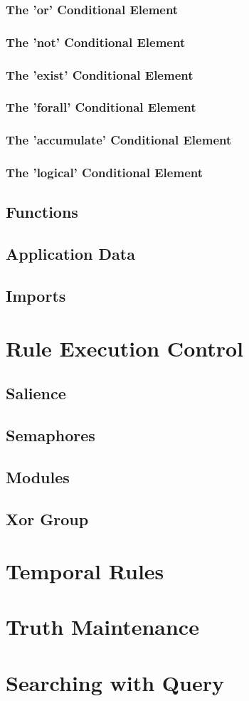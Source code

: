 \subsubsection{The 'or' Conditional Element}
\subsubsection{The 'not' Conditional Element}
\subsubsection{The 'exist' Conditional Element}
\subsubsection{The 'forall' Conditional Element}
\subsubsection{The 'accumulate' Conditional Element}
\subsubsection{The 'logical' Conditional Element}                       

\subsection{Functions}

\subsection{Application Data}

\subsection{Imports}

\section{Rule Execution Control}
\subsection{Salience}
\subsection{Semaphores}
\subsection{Modules}
\subsection{Xor Group}

\section{Temporal Rules}

\section{Truth Maintenance}

\section{Searching with Query}

